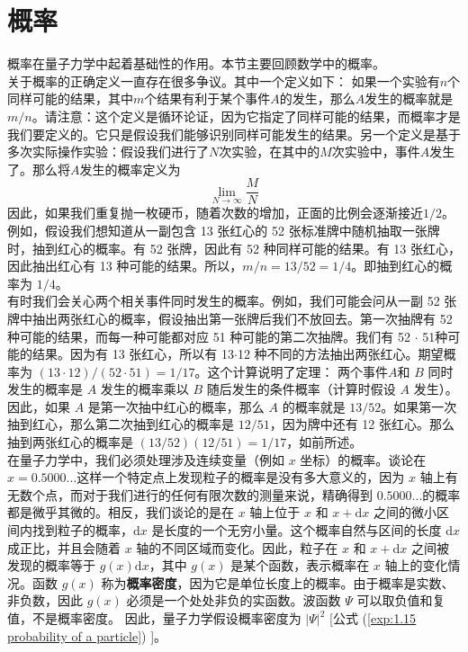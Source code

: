 	\section{概率}
	概率在量子力学中起着基础性的作用。本节主要回顾数学中的概率。\\
	\indent 关于概率的正确定义一直存在很多争议。其中一个定义如下： 如果一个实验有$n$个同样可能的结果，其中$m$个结果有利于某个事件$A$的发生，那么$A$发生的概率就是$m/n$。请注意：这个定义是循环论证，因为它指定了同样可能的结果，而概率才是我们要定义的。它只是假设我们能够识别同样可能发生的结果。另一个定义是基于多次实际操作实验：假设我们进行了$N$次实验，在其中的$M$次实验中，事件$A$发生了。那么将$A$发生的概率定义为
	\begin{equation*}
		\lim\limits_{N \to \infty}\frac{M}{N}
	\end{equation*}
	因此，如果我们重复抛一枚硬币，随着次数的增加，正面的比例会逐渐接近$1/2$。\\
	\indent 例如，假设我们想知道从一副包含 13 张红心的 52 张标准牌中随机抽取一张牌时，抽到红心的概率。有 52 张牌，因此有 52 种同样可能的结果。有 13 张红心，因此抽出红心有 13 种可能的结果。所以，$m/n = 13/52 = 1/4 $。即抽到红心的概率为 $1/4$。\\
	\indent 有时我们会关心两个相关事件同时发生的概率。例如，我们可能会问从一副 52 张牌中抽出两张红心的概率，假设抽出第一张牌后我们不放回去。第一次抽牌有 52 种可能的结果，而每一种可能都对应 51 种可能的第二次抽牌。我们有 52 $\cdot$ 51种可能的结果。因为有 13 张红心，所以有 13$\cdot$12 种不同的方法抽出两张红心。期望概率为 $\left(13\cdot12\right)/\left(52\cdot51\right)=1/17$。这个计算说明了定理： 两个事件$A$和 $B$ 同时发生的概率是 $A$ 发生的概率乘以 $B$ 随后发生的条件概率（计算时假设 $A$ 发生）。因此，如果 $A$ 是第一次抽中红心的概率，那么 $A$ 的概率就是 $13/52$。如果第一次抽到红心，那么第二次抽到红心的概率是 $12/51$，因为牌中还有 12 张红心。那么抽到两张红心的概率是 $\left(13/52\right)\left(12/51\right)=1/17$，如前所述。\\
	\indent 在量子力学中，我们必须处理涉及连续变量（例如 $x$ 坐标）的概率。谈论在 $x=0.5000...$这样一个特定点上发现粒子的概率是没有多大意义的，因为 $x$ 轴上有无数个点，而对于我们进行的任何有限次数的测量来说，精确得到 $0.5000...$的概率都是微乎其微的。相反，我们谈论的是在 $x$ 轴上位于 $x$ 和 $x+\mathrm{d}x$ 之间的微小区间内找到粒子的概率，$\mathrm{d}x$ 是长度的一个无穷小量。这个概率自然与区间的长度 $\mathrm{d}x$ 成正比，并且会随着 $x$ 轴的不同区域而变化。因此，粒子在 $x$ 和 $x+\mathrm{d}x$ 之间被发现的概率等于 $g\left(x\right)\mathrm{d}x$，其中 $g\left(x\right)$ 是某个函数，表示概率在 $x$ 轴上的变化情况。函数 $g\left(x\right)$ 称为\textbf{概率密度}，因为它是单位长度上的概率。由于概率是实数、非负数，因此 $g\left(x\right)$ 必须是一个处处非负的实函数。波函数 $\Psi$ 可以取负值和复值，不是概率密度。 因此，量子力学假设概率密度为 $\left|\Psi\right|^2$ [公式 (\ref{exp:1.15 probability of a particle}) ]。\\
